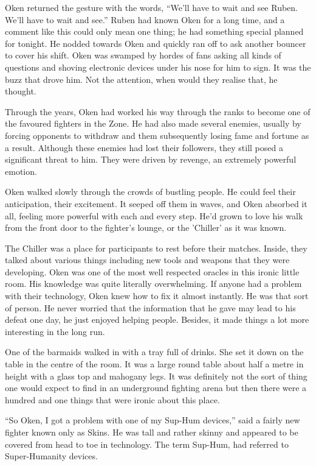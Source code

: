 Oken returned the gesture with the words, ``We'll have to wait and see Ruben. We'll have to wait and see.'' Ruben had known Oken for a long time, and a comment like this could only mean one thing; he had something special planned for tonight. He nodded towards Oken and quickly ran off to ask another bouncer to cover his shift. Oken was swamped by hordes of fans asking all kinds of questions and shoving electronic devices under his nose for him to sign. It was the buzz that drove him. Not the attention, when would they realise that, he thought.

Through the years, Oken had worked his way through the ranks to become one of the favoured fighters in the Zone. He had also made several enemies, usually by forcing opponents to withdraw and them subsequently losing fame and fortune as a result. Although these enemies had lost their followers, they still posed a significant threat to him. They were driven by revenge, an extremely powerful emotion. 

Oken walked slowly through the crowds of bustling people. He could feel their anticipation, their excitement. It seeped off them in waves, and Oken absorbed it all, feeling more powerful with each and every step. He'd grown to love his walk from the front door to the fighter's lounge, or the 'Chiller' as it was known. 

The Chiller was a place for participants to rest before their matches. Inside, they talked about various things including new tools and weapons that they were developing. Oken was one of the most well respected oracles in this ironic little room. His knowledge was quite literally overwhelming. If anyone had a problem with their technology, Oken knew how to fix it almost instantly. He was that sort of person. He never worried that the information that he gave may lead to his defeat one day, he just enjoyed helping people. Besides, it made things a lot more interesting in the long run.

One of the barmaids walked in with a tray full of drinks. She set it down on the table in the centre of the room. It was a large round table about half a metre in height with a glass top and mahogany legs. It was definitely not the sort of thing one would expect to find in an underground fighting arena but then there were a hundred and one things that were ironic about this place. 

``So Oken, I got a problem with one of my Sup-Hum devices,'' said a fairly new fighter known only as Skins. He was tall and rather skinny and appeared to be covered from head to toe in technology. The term Sup-Hum, had referred to Super-Humanity devices. 

